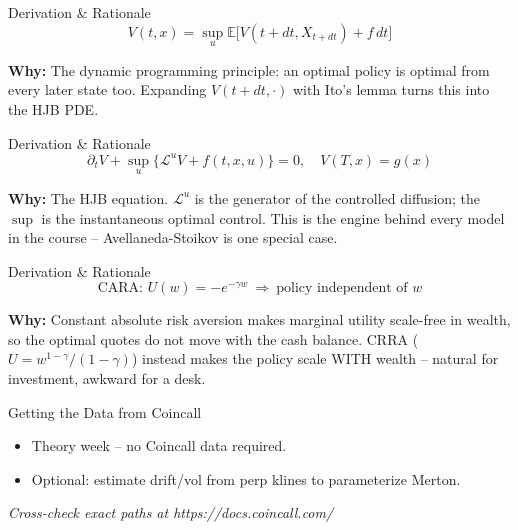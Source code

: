 \documentclass[aspectratio=169,10pt]{beamer}
\begin{document}
\begin{frame}{Derivation \& Rationale}
\[V(t,x)=\sup_u \mathbb{E}\big[V(t{+}dt, X_{t+dt}) + f\,dt\big]\]

\small\textbf{\color{ncsured}Why:} The dynamic programming principle: an optimal policy is optimal from every later state too. Expanding $V(t+dt,\cdot)$ with Ito's lemma turns this into the HJB PDE.
\end{frame}

\begin{frame}{Derivation \& Rationale}
\[\partial_t V + \sup_{u}\big\{\mathcal{L}^u V + f(t,x,u)\big\}=0,\quad V(T,x)=g(x)\]

\small\textbf{\color{ncsured}Why:} The HJB equation. $\mathcal{L}^u$ is the generator of the controlled diffusion; the $\sup$ is the instantaneous optimal control. This is the engine behind every model in the course -- Avellaneda-Stoikov is one special case.
\end{frame}

\begin{frame}{Derivation \& Rationale}
\[\text{CARA: } U(w)=-e^{-\gamma w}\ \Rightarrow\ \text{policy independent of } w\]

\small\textbf{\color{ncsured}Why:} Constant absolute risk aversion makes marginal utility scale-free in wealth, so the optimal quotes do not move with the cash balance. CRRA ($U=w^{1-\gamma}/(1-\gamma)$) instead makes the policy scale WITH wealth -- natural for investment, awkward for a desk.
\end{frame}

\begin{frame}{Getting the Data from Coincall}
\begin{itemize}
  \item Theory week -- no Coincall data required.
  \item Optional: estimate drift/vol from perp klines to parameterize Merton.
\end{itemize}
\vspace{2pt}\tiny\textit{Cross-check exact paths at https://docs.coincall.com/}
\end{frame}
\end{document}
